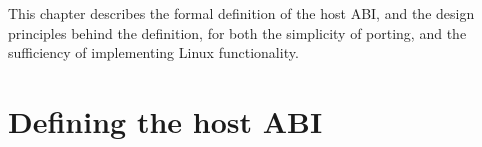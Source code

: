 This chapter describes the formal definition of the \graphene{} host ABI, and 
the design principles behind the definition, for both the simplicity of porting, and the sufficiency of implementing Linux functionality.






\section{Defining the host ABI}


\begin{comment}
This chapter describes the formal definition of the host ABI, and discusses the rationale behind the definition, based on the design principles of \graphene{}.
The host ABI is a key component
to the \graphene{} design,
to simplify the OS development effort for achieving or restoring compatibility.
This chapter shows how to select the host ABI as a ``pinch point'' in a Linux-compatible OS, to virtualize OS components into the user space.
\end{comment}




